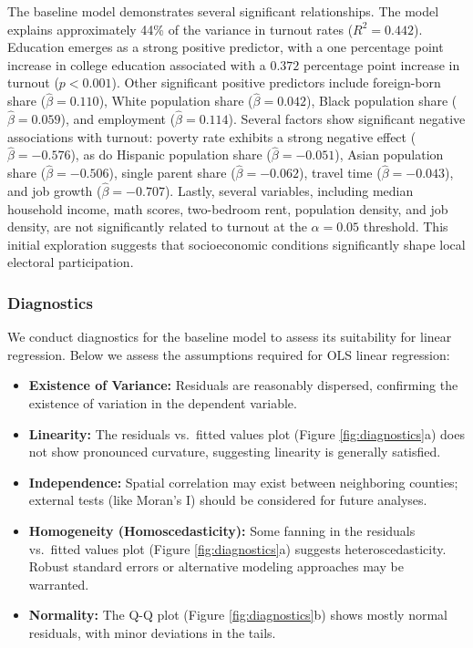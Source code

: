 \documentclass[
]{article}
\providecommand{\tightlist}{%
  \setlength{\itemsep}{0pt}\setlength{\parskip}{0pt}}
\begin{document}
The baseline model demonstrates several significant relationships. The model explains approximately 44\% of the variance in turnout rates (\(R^2 = 0.442\)). Education emerges as a strong positive predictor, with a one percentage point increase in college education associated with a \(0.372\) percentage point increase in turnout (\(p < 0.001\)). Other significant positive predictors include foreign-born share (\(\hat{\beta} = 0.110\)), White population share (\(\hat{\beta} = 0.042\)), Black population share (\(\hat{\beta} = 0.059\)), and employment (\(\hat{\beta} = 0.114\)). Several factors show significant negative associations with turnout: poverty rate exhibits a strong negative effect (\(\hat{\beta} = -0.576\)), as do Hispanic population share (\(\hat{\beta} = -0.051\)), Asian population share (\(\hat{\beta} = -0.506\)), single parent share (\(\hat{\beta} = -0.062\)), travel time (\(\hat{\beta} = -0.043\)), and job growth (\(\hat{\beta} = -0.707\)). Lastly, several variables, including median household income, math scores, two-bedroom rent, population density, and job density, are not significantly related to turnout at the \(\alpha = 0.05\) threshold. This initial exploration suggests that socioeconomic
conditions significantly shape local electoral participation.

\subsubsection{Diagnostics}\label{diagnostics}

We conduct diagnostics for the baseline model to assess its suitability for linear regression. Below we assess the assumptions required for OLS linear regression:

\begin{itemize}
\tightlist
\item
  \textbf{Existence of Variance:} Residuals are reasonably dispersed, confirming the existence of variation in
  the dependent variable.
\item
  \textbf{Linearity:} The residuals vs.~fitted values plot (Figure \ref{fig:diagnostics}a) does not show pronounced curvature, suggesting linearity is generally satisfied.
\item
  \textbf{Independence:} Spatial correlation may exist between neighboring counties; external tests (like Moran's I) should be considered for future analyses.
\item
  \textbf{Homogeneity (Homoscedasticity):} Some fanning in the residuals vs.~fitted values plot (Figure \ref{fig:diagnostics}a) suggests heteroscedasticity. Robust standard errors or alternative modeling approaches may be warranted.
\item
  \textbf{Normality:} The Q-Q plot (Figure \ref{fig:diagnostics}b) shows mostly normal residuals, with minor deviations in the tails.
\end{itemize}
\end{document}
